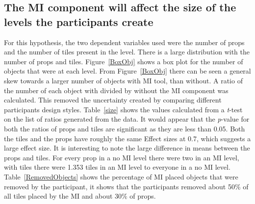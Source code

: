 \documentclass[journal]{IEEEtran}
\begin{document}
\subsection{The MI component will affect the size of the levels the participants create}\label{sizeSec}
For this hypothesis, the two dependent variables used were the number of props and the number of tiles present in the level. There is a large distribution with the number of props and tiles. Figure~\ref{BoxObj} shows a box plot for the number of objects that were at each level. From Figure~\ref{BoxObj} there can be seen a general skew towards a larger number of objects with MI tool, than without. A ratio of the number of each object with divided by without the MI component was calculated. This removed the uncertainty created by comparing different participants design styles. Table~\ref{size} shows the values calculated from a \textit{t}-test on the list of ratios generated from the data. It would appear that the \textit{p}-value for both the ratios of props and tiles are significant as they are less than 0.05. Both the tiles and the props have roughly the same Effect sizes at 0.7, which suggests a large effect size\cite{cohen1988statistical}. It is interesting to note the large difference in means between the props and tiles. For every prop in a no MI level there were two in an MI level, with tiles there were 1.353 tiles in an MI level to everyone in a no MI level. Table~\ref{RemovedObjects} shows the percentage of MI placed objects that were removed by the participant, it shows that the participants removed about 50\% of all tiles placed by the MI and about 30\% of props.
\end{document}
